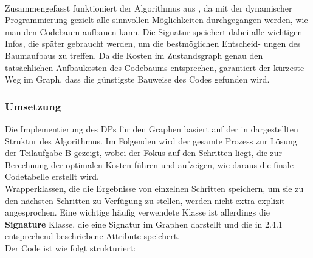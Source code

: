 \documentclass[a4paper,10pt,ngerman]{scrartcl}
\begin{document}
\\\newline
Zusammengefasst funktioniert der Algorithmus aus \cite{papergolinrote}, da mit der dynamischer Programmierung gezielt alle sinnvollen Möglichkeiten durchgegangen werden, wie man den Codebaum aufbauen kann. Die Signatur speichert dabei alle wichtigen Infos, die später gebraucht werden, um die bestmöglichen Entscheid- ungen des Baumaufbaus zu treffen. Da die Kosten im Zustandsgraph genau den tatsächlichen Aufbaukosten des Codebaums entsprechen, garantiert der kürzeste Weg im Graph, dass die günstigste Bauweise des Codes gefunden wird.


\subsubsection{Umsetzung}
Die Implementierung des DPs für den Graphen basiert auf der in \cite[Figure 6]{papergolinrote} dargestellten Struktur des Algorithmus. Im Folgenden wird der gesamte Prozess zur Lösung der Teilaufgabe B gezeigt, wobei der Fokus auf den Schritten liegt, die zur Berechnung der optimalen Kosten führen und aufzeigen, wie daraus die finale Codetabelle erstellt wird. \\
Wrapperklassen, die die Ergebnisse von einzelnen Schritten speichern, um sie zu den nächsten Schritten zu Verfügung zu stellen, werden nicht extra explizit angesprochen. Eine wichtige häufig verwendete Klasse ist allerdings die \textbf{Signature} Klasse, die eine Signatur im Graphen darstellt und die in 2.4.1 entsprechend beschriebene Attribute speichert. 
\\\newline
Der Code ist wie folgt strukturiert:
\end{document}
